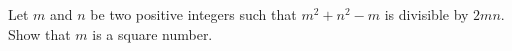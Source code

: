 Let $m$ and $n$ be two positive integers such that $m^2+n^2-m$ is divisible by $2mn$.
Show that $m$ is a square number.